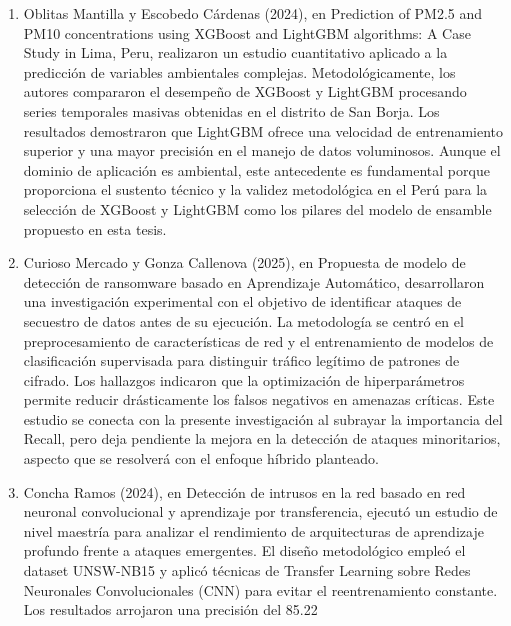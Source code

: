 \begin{enumerate}
\item Oblitas Mantilla y Escobedo Cárdenas (2024), en Prediction of PM2.5 and PM10 concentrations using XGBoost and LightGBM algorithms: A Case Study in Lima, Peru, realizaron un estudio cuantitativo aplicado a la predicción de variables ambientales complejas. Metodológicamente, los autores compararon el desempeño de XGBoost y LightGBM procesando series temporales masivas obtenidas en el distrito de San Borja. Los resultados demostraron que LightGBM ofrece una velocidad de entrenamiento superior y una mayor precisión en el manejo de datos voluminosos. Aunque el dominio de aplicación es ambiental, este antecedente es fundamental porque proporciona el sustento técnico y la validez metodológica en el Perú para la selección de XGBoost y LightGBM como los pilares del modelo de ensamble propuesto en esta tesis.

\item Curioso Mercado y Gonza Callenova (2025), en Propuesta de modelo de detección de ransomware basado en Aprendizaje Automático, desarrollaron una investigación experimental con el objetivo de identificar ataques de secuestro de datos antes de su ejecución. La metodología se centró en el preprocesamiento de características de red y el entrenamiento de modelos de clasificación supervisada para distinguir tráfico legítimo de patrones de cifrado. Los hallazgos indicaron que la optimización de hiperparámetros permite reducir drásticamente los falsos negativos en amenazas críticas. Este estudio se conecta con la presente investigación al subrayar la importancia del Recall, pero deja pendiente la mejora en la detección de ataques minoritarios, aspecto que se resolverá con el enfoque híbrido planteado.

\item Concha Ramos (2024), en Detección de intrusos en la red basado en red neuronal convolucional y aprendizaje por transferencia, ejecutó un estudio de nivel maestría para analizar el rendimiento de arquitecturas de aprendizaje profundo frente a ataques emergentes. El diseño metodológico empleó el dataset UNSW-NB15 y aplicó técnicas de Transfer Learning sobre Redes Neuronales Convolucionales (CNN) para evitar el reentrenamiento constante. Los resultados arrojaron una precisión del 85.22%

\end{enumerate}

